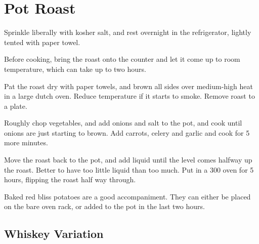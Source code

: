 \section{Pot Roast}
\begin{recipe}


Sprinkle liberally with kosher salt, and rest overnight in the refrigerator, lightly tented with paper towel.

Before cooking, bring the roast onto the counter and let it come up to room temperature, which can take up to two hours.

Pat the roast dry with paper towels, and brown all sides over medium-high heat in a large dutch oven. Reduce temperature if it starts to smoke. Remove roast to a plate.


Roughly chop vegetables, and add onions and salt to the pot, and cook until onions are just starting to brown. Add carrots, celery and garlic and cook for 5 more minutes.


Move the roast back to the pot, and add liquid until the level comes halfway up the roast. Better to have too little liquid than too much. Put in a 300\degree{} oven for 5 hours, flipping the roast half way through.


Baked red bliss potatoes are a good accompaniment. They can either be placed on the bare oven rack, or added to the pot in the last two hours.

\subsection{Whiskey Variation}

\end{recipe}
